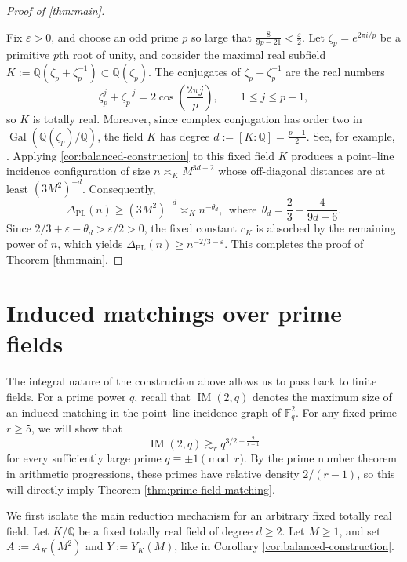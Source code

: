 \documentclass[11pt,reqno]{amsart}
\theoremstyle{definition}
\theoremstyle{remark}
\newcommand{\Q}{\mathbb{Q}}
\newcommand{\eps}{\varepsilon}
\newcommand{\PL}{\Delta_{\mathrm{PL}}}
\begin{document}
\begin{proof}[Proof of \cref{thm:main}]
\label{sec:sharp}

Fix $\eps>0$, and choose an odd prime $p$ so large that $\frac{8}{9p-21}<\frac{\eps}{2}$. Let $\zeta_p=e^{2\pi i/p}$ be a primitive $p$th root of unity, and consider the maximal real subfield $K:=\Q(\zeta_p+\zeta_p^{-1}) \subset\Q(\zeta_p)$. The conjugates of $\zeta_p+\zeta_p^{-1}$ are the real numbers
\[
        \zeta_p^j+\zeta_p^{-j}
        =2\cos\left(\frac{2\pi j}{p}\right),
        \qquad 1\le j\le p-1,
\]
so $K$ is totally real. Moreover, since complex conjugation has order two in $\operatorname{Gal}(\Q(\zeta_p)/\Q)$, the field $K$ has degree $d:=[K:\Q]=\frac{p-1}{2}$. See, for example, \cite{Washington1997}. Applying \cref{cor:balanced-construction} to this fixed field $K$
produces a point--line incidence configuration of size
$n\asymp_K M^{3d-2}$ whose off-diagonal distances are at least
$(3M^2)^{-d}$. Consequently,
\[
        \PL(n)\ge (3M^2)^{-d} \asymp_{K} n^{-\theta_d},\ \ \text{where}\ \ \theta_d = \frac23 + \frac{4}{9d-6}.
\]
Since $2/3+\eps-\theta_d>\eps/2>0$, the fixed constant $c_K$ is absorbed by the remaining power of $n$, which yields $\PL(n)\ge n^{-2/3-\eps}$. This completes the proof of Theorem \ref{thm:main}.
\end{proof}


\section{Induced matchings over prime fields}
\label{sec:split-primes}

The integral nature of the construction above allows us to pass back to finite fields. For a prime power $q$, recall that
$\operatorname{IM}(2,q)$ denotes the maximum size of an induced matching in the point--line incidence graph of $\mathbb F_q^2$. For any fixed prime $r\ge5$, we will show that
\begin{equation}
\label{eq:cyclotomic-IM-intro}
        \operatorname{IM}(2,q)
        \gtrsim_r q^{3/2-\frac{2}{r-1}}
\end{equation}
for every sufficiently large prime $q\equiv\pm1\pmod r$. By the prime number theorem in arithmetic progressions, these primes have relative density $2/(r-1)$, so this will directly imply Theorem \ref{thm:prime-field-matching}. 

We first isolate the main reduction mechanism for an arbitrary fixed totally real field. Let $K/\Q$ be a fixed totally real field of degree $d\ge2$. Let $M\ge1$, and set $A:=A_K(M^2)$ and $Y:=Y_K(M)$, like in Corollary \ref{cor:balanced-construction}.
\end{document}
